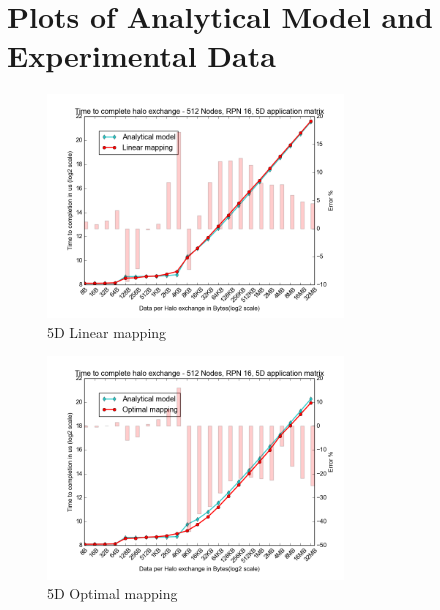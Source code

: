 \documentclass{beamer}
\begin{document}
%
%  

\section{Plots of Analytical Model and Experimental Data}
\begin{frame}
\begin{figure}
\caption{5D Linear mapping}
  \includegraphics[width=0.7\textwidth]{../mappings/5d_linear_model.png}
\end{figure}
\end{frame}


\begin{frame}
\begin{figure}
\caption{5D Optimal mapping}
  \includegraphics[width=0.7\textwidth]{../mappings/5d_optimal_model.png}
\end{figure}
\end{frame}
\end{document}
